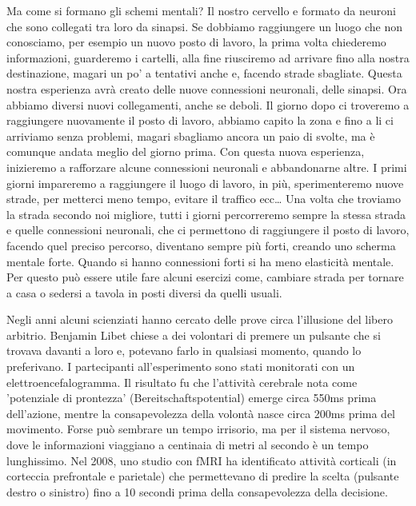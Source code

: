 \documentclass[12pt]{book} %
\begin{document}
Ma come si formano gli schemi mentali? Il nostro cervello e formato da neuroni che sono collegati tra loro da sinapsi. Se dobbiamo
raggiungere un luogo che non conosciamo, per esempio un nuovo posto di lavoro, la prima volta chiederemo informazioni,
guarderemo i cartelli, alla fine riusciremo ad arrivare fino alla nostra destinazione, magari un po' a tentativi anche
e, facendo strade sbagliate. Questa nostra esperienza avrà creato delle nuove connessioni neuronali, delle sinapsi. Ora
abbiamo diversi nuovi collegamenti, anche se deboli. Il giorno dopo ci troveremo a raggiungere nuovamente il posto di
lavoro, abbiamo capito la zona e fino a li ci arriviamo senza problemi, magari sbagliamo ancora un paio di svolte, ma è
comunque andata meglio del giorno prima. Con questa nuova esperienza, inizieremo a rafforzare alcune connessioni
neuronali e abbandonarne altre. I primi giorni impareremo a raggiungere il luogo di lavoro, in più, sperimenteremo
nuove strade, per metterci meno tempo, evitare il traffico ecc… Una volta che troviamo la strada secondo noi migliore,
tutti i giorni percorreremo sempre la stessa strada e quelle connessioni neuronali, che ci permettono di raggiungere il
posto di lavoro, facendo quel preciso percorso, diventano sempre più forti, creando uno scherma mentale forte. Quando
si hanno connessioni forti si ha meno elasticità mentale. Per questo può essere utile fare alcuni esercizi come,
cambiare strada per tornare a casa o sedersi a tavola in posti diversi da quelli usuali.

Negli anni alcuni scienziati hanno cercato delle prove circa l'illusione del libero arbitrio.
Benjamin Libet chiese a dei volontari di premere un pulsante che si trovava davanti a loro e, potevano farlo in
qualsiasi momento, quando lo preferivano. I partecipanti all'esperimento sono stati monitorati con
un elettroencefalogramma. Il risultato fu che l'attività cerebrale nota come 'potenziale di prontezza' (Bereitschaftspotential) emerge circa 550ms prima dell’azione, mentre la consapevolezza della volontà nasce circa 200ms prima del movimento.
Forse può sembrare un tempo irrisorio, ma per il sistema nervoso, dove le informazioni viaggiano a centinaia di metri
al secondo è un tempo lunghissimo. Nel 2008, uno studio con fMRI ha identificato attività corticali (in corteccia prefrontale e parietale) che permettevano di predire la scelta (pulsante destro o sinistro) fino a 10 secondi prima della consapevolezza della decisione.
\end{document}
